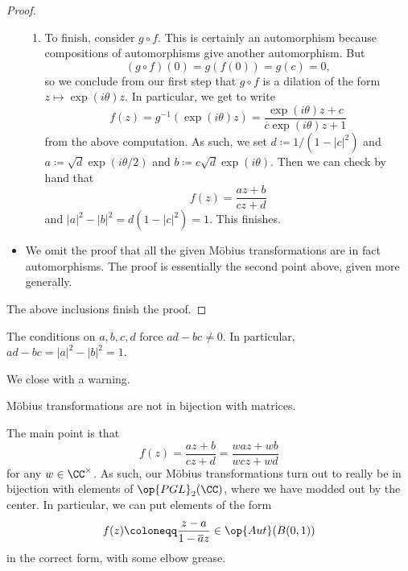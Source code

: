 \documentclass[../notes.tex]{subfiles}
\begin{document}
\begin{proof}
\begin{itemize}
\begin{enumerate}
			\item To finish, consider $g\circ f$. This is certainly an automorphism because compositions of automorphisms give another automorphism. But
			\[(g\circ f)(0)=g(f(0))=g(c)=0,\]
			so we conclude from our first step that $g\circ f$ is a dilation of the form $z\mapsto\exp(i\theta)z$. In particular, we get to write
			\[f(z)=g^{-1}(\exp(i\theta)z)=\frac{\exp(i\theta)z+c}{\overline c\exp(i\theta)z+1}\]
			from the above computation. As such, we set $d\coloneqq 1/\left(1-|c|^2\right)$ and $a\coloneqq\sqrt d\exp(i\theta/2)$ and $b\coloneqq c\sqrt d\exp(i\theta)$. Then we can check by hand that
			\[f(z)=\frac{az+b}{cz+d}\]
			and $|a|^2-|b|^2=d\left(1-|c|^2\right)=1$. This finishes.
		\end{enumerate}
		\item We omit the proof that all the given M\"obius transformations are in fact automorphisms. The proof is essentially the second point above, given more generally.
	\end{itemize}
	The above inclusions finish the proof.
\end{proof}
\begin{remark}
	The conditions on $a,b,c,d$ force $ad-bc\ne0$. In particular, $ad-bc=|a|^2-|b|^2=1$.
\end{remark}
We close with a warning.
\begin{warn}
	M\"obius transformations are not in bijection with matrices.
\end{warn}
The main point is that
\[f(z)=\frac{az+b}{cz+d}=\frac{waz+wb}{wcz+wd}\]
for any $w\in\CC^\times$. As such, our M\"obius transformations turn out to really be in bijection with elements of $\op{PGL}_2(\CC)$, where we have modded out by the center. In particular, we can put elements of the form
\[f(z)\coloneqq\frac{z-a}{1-\overline az}\in\op{Aut}(B(0,1))\]
in the correct form, with some elbow grease.
\end{document}
